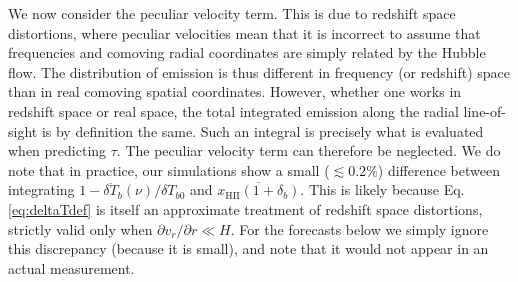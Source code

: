 \documentclass[twocolumn,aps,prd,nofootinbib,showpacs]{revtex4-1}
\begin{document}
We now consider the peculiar velocity term. This is due to redshift space distortions, where peculiar velocities mean that it is incorrect to assume that frequencies and comoving radial coordinates are simply related by the Hubble flow. The distribution of emission is thus different in frequency (or redshift) space than in real comoving spatial coordinates. However, whether one works in redshift space or real space, the total integrated emission along the radial line-of-sight is by definition the same. Such an integral is precisely what is evaluated when predicting $\tau$. The peculiar velocity term can therefore be neglected. We do note that in practice, our simulations show a small ($\lesssim 0.2\%$) difference between integrating $1- \overline{\delta T}_b (\nu) / \delta T_{b0}$ and $\overline{x_\textrm{HII} (1+\delta_b)}$. This is likely because Eq. \eqref{eq:deltaTdef} is itself an approximate treatment of redshift space distortions, strictly valid only when $\partial v_r / \partial r \ll H$. For the forecasts below we simply ignore this discrepancy (because it is small), and note that it would not appear in an actual measurement.
%
\end{document}
